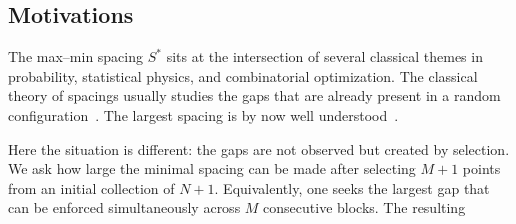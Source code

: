 \documentclass[a4paper,reqno,11pt]{amsart}
\numberwithin{equation}{section}
\numberwithin{thm}{section}
\theoremstyle{plain}
\theoremstyle{definition}
\begin{document}
\subsection{Motivations}

The max--min spacing $S^*$ sits at the intersection of several classical themes in probability, statistical physics, and combinatorial optimization. 
The classical theory of spacings usually studies the gaps that are already
present in a random configuration~\cite{HajosRenyi1954,Pyke1965,Pyke1972,DavidNagaraja2003,ArnoldBalakrishnanNagaraja1992}. The largest spacing is by now well understood~\cite{Bairamov2010,Deheuvels1982,MijatovicVysotsky2015,Cunden2021}. 

Here the situation is
different: the gaps are not observed but created by selection. We ask how
large the minimal spacing can be made after selecting $M+1$ points from an
initial collection of $N+1$. Equivalently, one seeks the largest gap that
can be enforced simultaneously across $M$ consecutive blocks. The resulting
\end{document}
